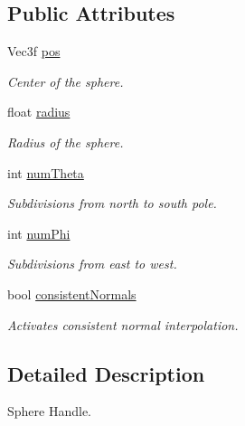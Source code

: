 \subsection*{Public Attributes}
\begin{DoxyCompactItemize}
\item 
Vec3f \hyperlink{classembree_1_1_sphere_handle_a5517706468c65621fed3fe75a5c1e435}{pos}
\begin{DoxyCompactList}\small\item\em Center of the sphere. \item\end{DoxyCompactList}\item 
float \hyperlink{classembree_1_1_sphere_handle_a84283a6dcc7412631db5f563ee2e7af0}{radius}
\begin{DoxyCompactList}\small\item\em Radius of the sphere. \item\end{DoxyCompactList}\item 
int \hyperlink{classembree_1_1_sphere_handle_a390f2744a81ad1a6dcce91d46c7d285b}{numTheta}
\begin{DoxyCompactList}\small\item\em Subdivisions from north to south pole. \item\end{DoxyCompactList}\item 
int \hyperlink{classembree_1_1_sphere_handle_aea0bffe7ea72ea3921cf214ab98c7293}{numPhi}
\begin{DoxyCompactList}\small\item\em Subdivisions from east to west. \item\end{DoxyCompactList}\item 
bool \hyperlink{classembree_1_1_sphere_handle_a8afa61052d682cb1257ae6c0f8e73e64}{consistentNormals}
\begin{DoxyCompactList}\small\item\em Activates consistent normal interpolation. \item\end{DoxyCompactList}\end{DoxyCompactItemize}


\subsection{Detailed Description}
Sphere Handle. 

